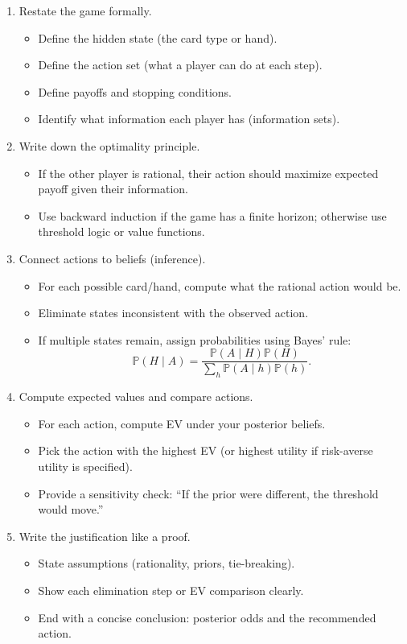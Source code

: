 \documentclass[11pt,letterpaper,openany]{book}
\begin{document}
\begin{enumerate}
  \item Restate the game formally.
  \begin{itemize}
    \item Define the hidden state (the card type or hand).
    \item Define the action set (what a player can do at each step).
    \item Define payoffs and stopping conditions.
    \item Identify what information each player has (information sets).
  \end{itemize}
  \item Write down the optimality principle.
  \begin{itemize}
    \item If the other player is rational, their action should maximize expected payoff given their information.
    \item Use backward induction if the game has a finite horizon; otherwise use threshold logic or value functions.
  \end{itemize}
  \item Connect actions to beliefs (inference).
  \begin{itemize}
    \item For each possible card/hand, compute what the rational action would be.
    \item Eliminate states inconsistent with the observed action.
    \item If multiple states remain, assign probabilities using Bayes' rule:
    \[
      \mathbb{P}(H \mid A) = \frac{\mathbb{P}(A \mid H)\mathbb{P}(H)}{\sum_h \mathbb{P}(A \mid h)\mathbb{P}(h)}.
    \]
  \end{itemize}
  \item Compute expected values and compare actions.
  \begin{itemize}
    \item For each action, compute EV under your posterior beliefs.
    \item Pick the action with the highest EV (or highest utility if risk-averse utility is specified).
    \item Provide a sensitivity check: ``If the prior were different, the threshold would move.''
  \end{itemize}
  \item Write the justification like a proof.
  \begin{itemize}
    \item State assumptions (rationality, priors, tie-breaking).
    \item Show each elimination step or EV comparison clearly.
    \item End with a concise conclusion: posterior odds and the recommended action.
  \end{itemize}
\end{enumerate}
\end{document}
